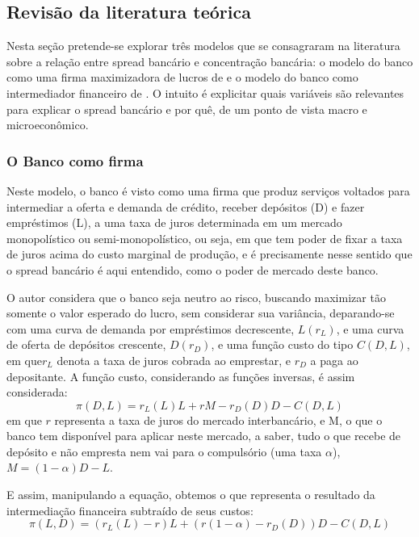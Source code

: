\documentclass[a4paper,
               article,
               12pt,
               openany,
               oneside,
               english,
               brazil]{abntex2}
\numberwithin{equation}{section}
\begin{document}
\subsection{Revisão da literatura teórica}

    Nesta seção pretende-se explorar três modelos que se consagraram na literatura sobre a relação entre spread bancário e concentração bancária: o modelo do banco como uma firma maximizadora de lucros de  e o modelo do banco como intermediador financeiro de . O intuito é explicitar quais variáveis são relevantes para explicar o spread bancário e por quê, de um ponto de vista macro e microeconômico.

\subsubsection{O Banco como firma}

    Neste modelo, o banco é visto como uma firma que produz serviços voltados para intermediar a oferta e demanda de crédito, receber depósitos (D) e fazer empréstimos (L), a uma taxa de juros determinada em um mercado monopolístico ou semi-monopolístico, ou seja, em que tem poder de fixar a taxa de juros acima do custo marginal de produção, e é precisamente nesse sentido que o spread bancário é aqui entendido, como o poder de mercado deste banco. \cite{oreiro}

    O autor considera que o banco seja neutro ao risco, buscando maximizar tão somente o valor esperado do lucro, sem considerar sua variância, deparando-se com uma curva de demanda por empréstimos decrescente, $L(r_L)$, e uma curva de oferta de depósitos crescente, $D(r_D)$, e uma função custo do tipo $C(D, L)$, em que$ r_L$ denota a taxa de juros cobrada ao emprestar, e $r_D$ a paga ao depositante. A função custo, considerando as funções inversas, é assim considerada: \begin{equation}\pi(D, L) = r_L(L)L + rM - r_D(D)D - C(D, L)\end{equation} em que $r$ representa a taxa de juros do mercado interbancário, e M, o que o banco tem disponível para aplicar neste mercado, a saber, tudo o que recebe de depósito e não empresta nem vai para o compulsório (uma taxa $\alpha$), $M = (1 - \alpha)D - L$.

    E assim, manipulando a equação, obtemos o que representa o resultado da intermediação financeira subtraído de seus custos: \begin{equation}\pi(L, D) = (r_L(L) - r)L + (r(1 - \alpha) - r_D(D))D - C(D, L)\end{equation}
\end{document}
